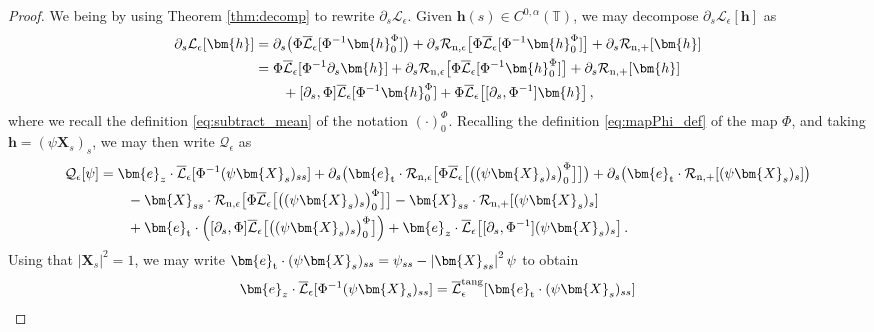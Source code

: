 \documentclass[11pt,reqno]{amsart}
\newcommand{\T}{\mathbb{T}}
\newcommand{\X}{\bm{X}}
\newcommand{\be}{\bm{e}}
\newcommand{\p}{\partial}
\newcommand{\abs}[1]{\left\lvert #1 \right\rvert}
\newcommand{\mc}[1]{\mathcal{#1}}
\theoremstyle{definition}
\begin{document}
\begin{proof}
We being by using Theorem \ref{thm:decomp} to rewrite $\p_s\mc{L}_\epsilon$. Given $\bm{h}(s)\in C^{0,\alpha}(\T)$, we may decompose $\p_s\mc{L}_\epsilon[\bm{h}]$ as 
\begin{equation}
\begin{aligned}
  \p_s\mc{L}_\epsilon[\bm{h}] &= \p_s\big(\Phi\overline{\mc{L}}_\epsilon[\Phi^{-1}\bm{h}_0^\Phi]\big) +\p_s\mc{R}_{\rm n,\epsilon}\big[\Phi\overline{\mc{L}}_\epsilon[\Phi^{-1}\bm{h}_0^\Phi]\big] +\p_s\mc{R}_{\rm n,+}[\bm{h}]\\
  &= \Phi\overline{\mc{L}}_\epsilon[\Phi^{-1}\p_s\bm{h}] +\p_s\mc{R}_{\rm n,\epsilon}\big[\Phi\overline{\mc{L}}_\epsilon[\Phi^{-1}\bm{h}_0^\Phi]\big] +\p_s\mc{R}_{\rm n,+}[\bm{h}]\\
  &\qquad+ [\p_s,\Phi]\overline{\mc{L}}_\epsilon[\Phi^{-1}\bm{h}_0^\Phi] + \Phi\overline{\mc{L}}_\epsilon\big[[\p_s,\Phi^{-1}]\bm{h}\big]\,,
\end{aligned}
\end{equation}
where we recall the definition \eqref{eq:subtract_mean} of the notation $(\cdot)_0^\Phi$. Recalling the definition \eqref{eq:mapPhi_def} of the map $\Phi$, and taking $\bm{h}=(\psi\X_s)_s$, we may then write $\mc{Q}_\epsilon$ as
\begin{equation}
\begin{aligned}
  \mc{Q}_\epsilon[\psi] 
  &= \be_z\cdot\overline{\mc{L}}_\epsilon[\Phi^{-1}(\psi\X_s)_{ss}] 
  + \p_s\big(\be_{\rm t}\cdot\mc{R}_{\rm n,\epsilon}\big[\Phi\overline{\mc{L}}_\epsilon\big[\big((\psi\X_s)_s \big)_0^\Phi\big]\big]\big) 
  +\p_s\big(\be_{\rm t}\cdot\mc{R}_{\rm n,+}[(\psi\X_s)_s]\big)\\
  &\qquad - \X_{ss}\cdot\mc{R}_{\rm n,\epsilon}\big[\Phi\overline{\mc{L}}_\epsilon\big[\big((\psi\X_s)_s \big)_0^\Phi\big]\big] 
  -\X_{ss}\cdot\mc{R}_{\rm n,+}[(\psi\X_s)_s]\\
  &\qquad+ \be_{\rm t}\cdot\left([\p_s,\Phi]\overline{\mc{L}}_\epsilon\big[\big((\psi\X_s)_s \big)_0^\Phi\big] \right)
  + \be_z\cdot\overline{\mc{L}}_\epsilon\big[[\p_s,\Phi^{-1}](\psi\X_s)_s\big]\,.
\end{aligned}
\end{equation}
%
%
Using that $\abs{\X_s}^2=1$, we may write $\be_{\rm t}\cdot(\psi\X_s)_{ss}=\psi_{ss}- \abs{\X_{ss}}^2\psi$ to obtain
\begin{equation}
  \be_z\cdot\overline{\mc{L}}_\epsilon[\Phi^{-1}(\psi\X_s)_{ss}] 
  = \overline{\mc{L}}_\epsilon^{\rm tang}[\be_{\rm t}\cdot(\psi\X_s)_{ss}]

\end{equation}
\end{proof}
\end{document}
